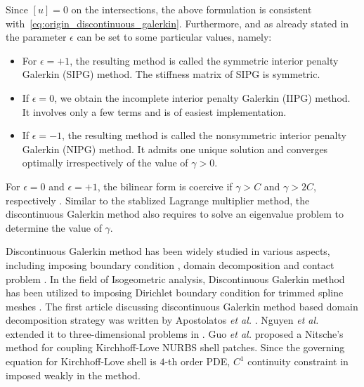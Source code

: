 \documentclass[preprint,12pt]{elsarticle}
\begin{document}
Since $\left[u\right]=0$ on the intersections, the above formulation is consistent with~\eqref{eq:origin_discontinuous_galerkin}. Furthermore, and as already stated in \cite{riviere2008discontinuous} the parameter $\epsilon$ can be set to some particular values, namely:
\begin{itemize}
    \item For $\epsilon=+1$, the resulting method is called the symmetric interior penalty Galerkin (SIPG) method. The stiffness matrix of SIPG is symmetric.
    \item If $\epsilon=0$, we obtain the incomplete interior penalty Galerkin (IIPG) method. It involves only a few terms and is of easiest implementation.
    \item If $\epsilon=-1$, the resulting method is called the nonsymmetric interior penalty Galerkin (NIPG) method. It admits one unique solution and converges optimally irrespectively of the value of $\gamma>0$.
\end{itemize}
For $\epsilon=0$ and $\epsilon=+1$, the bilinear form is coercive if $\gamma>C$ and $\gamma>2C$, respectively \cite{riviere2008discontinuous}. Similar to the stablized Lagrange multiplier method, the discontinuous Galerkin method also requires to solve an eigenvalue problem to determine the value of $\gamma$.\par

Discontinuous Galerkin method has been widely studied in various aspects, including imposing boundary condition \cite{hansbo_nitsches_2005}, domain decomposition \cite{becker_finite_2003} and contact problem \cite{chouly_symmetric_2015}. In the field of Isogeometric analysis, Discontinuous Galerkin method has been utilized to imposing Dirichlet boundary condition for trimmed spline meshes \cite{embar_imposing_2010}. The first article discussing discontinuous Galerkin method based domain decomposition strategy was written by Apostolatos \textit{et al.} \cite{apostolatos_nitsche-type_2014}. Nguyen \textit{et al.} extended it to three-dimensional problems in \cite{nguyen_nitsches_2014}. Guo \textit{et al.} \cite{guo_nitsches_2015} proposed a Nitsche's method for coupling Kirchhoff-Love NURBS shell patches. Since the governing equation for Kirchhoff-Love shell is $4$-th order PDE, $C^1$ continuity constraint in imposed weakly in the method. \par
\end{document}
